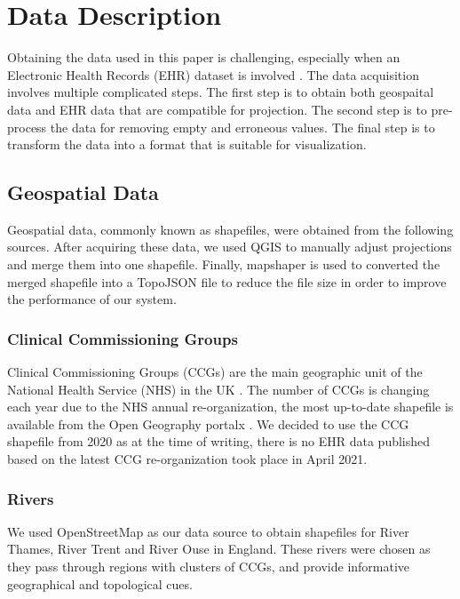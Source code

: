 \section{Data Description}

Obtaining the data used in this paper is challenging, especially when an Electronic Health Records (EHR) dataset is involved \cite{wang2021EHRa}. The data acquisition involves multiple complicated steps. The first step is to obtain both geospaital data and EHR data that are compatible for projection. The second step is to pre-process the data for removing empty and erroneous values. The final step is to transform the data into a format that is suitable for visualization.

\subsection{Geospatial Data}

Geospatial data, commonly known as shapefiles, were obtained from the following sources. After acquiring these data, we used QGIS \cite{qgisWelcome} to manually adjust projections and merge them into one shapefile. Finally, mapshaper \cite{blochMapshaper} is used to converted the merged shapefile into a TopoJSON \cite{TopoJSON} file to reduce the file size in order to improve the performance of our system.

\subsubsection{Clinical Commissioning Groups}

Clinical Commissioning Groups (CCGs) are the main geographic unit of the National Health Service (NHS) in the UK \cite{nhsNHS}. The number of CCGs is changing each year due to the NHS annual re-organization, the most up-to-date shapefile is available from the Open Geography portalx \cite{opengeographyportalxOpen}. We decided to use the CCG shapefile from 2020 as at the time of writing, there is no EHR data published based on the latest CCG re-organization took place in April 2021.

\subsubsection{Rivers}

We used OpenStreetMap \cite{openstreetmapRelation} as our data source to obtain shapefiles for River Thames, River Trent and River Ouse in England. These rivers were chosen as they pass through regions with clusters of CCGs, and provide informative geographical and topological cues. 

